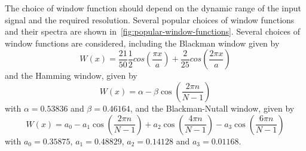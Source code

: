 The choice of window function should depend on the dynamic range of the input signal and the required resolution. Several popular choices of window functions and their spectra are shown in~\ref{fig:popular-window-functions}. Several choices of window functions are considered, including the Blackman window\cite{} given by
$$
W(x) = \frac{21}{50} \frac{1}{2} cos ( \frac{\pi x}{a} ) + \frac{2}{25} cos (
\frac{2 \pi x }{a} )
$$
and the Hamming window\cite{}, given by
$$
W(x) = \alpha - \beta \cos\left(\frac{2 \pi n}{N - 1}\right)
$$
with $\alpha = 0.53836$ and $\beta = 0.46164$, and the Blackman-Nutall window\cite{}, given by
$$
W(x) = a_0 - a_1 \cos \left( \frac{ 2 \pi n }{N - 1} \right) + a_2 \cos \left(
  \frac{ 4 \pi n }{ N - 1} \right) - a_3 \cos \left( \frac{ 6 \pi n }{N - 1} \right)
$$
with $a_0 = 0.35875$, $a_1 = 0.48829$, $a_2 = 0.14128$ and $a_3 = 0.01168$.
